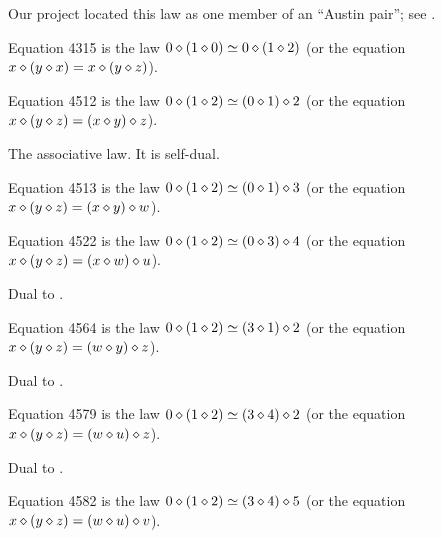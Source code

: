 Our project located this law as one member of an ``Austin pair''; see .

\begin{definition}[Equation 4315]\label{eq4315}\leanok{}  Equation 4315 is the law $0 \diamond (1 \diamond 0)  \simeq  0 \diamond (1 \diamond 2)$ (or the equation $x \diamond (y \diamond x) = x \diamond (y \diamond z)$).
\end{definition}

\begin{definition}[Equation 4512]\label{eq4512}\leanok{}  Equation 4512 is the law $0 \diamond (1 \diamond 2)  \simeq  (0 \diamond 1) \diamond 2$ (or the equation $x \diamond (y \diamond z) = (x \diamond y) \diamond z$).
\end{definition}

The associative law. It is self-dual.

\begin{definition}[Equation 4513]\label{eq4513}\leanok{}  Equation 4513 is the law $0 \diamond (1 \diamond 2)  \simeq  (0 \diamond 1) \diamond 3$ (or the equation $x \diamond (y \diamond z) = (x \diamond y) \diamond w$).
\end{definition}

\begin{definition}[Equation 4522]\label{eq4522}\leanok{}  Equation 4522 is the law $0 \diamond (1 \diamond 2)  \simeq  (0 \diamond 3) \diamond 4$ (or the equation $x \diamond (y \diamond z) = (x \diamond w) \diamond u$).
\end{definition}

Dual to .

\begin{definition}[Equation 4564]\label{eq4564}\leanok{}  Equation 4564 is the law $0 \diamond (1 \diamond 2)  \simeq  (3 \diamond 1) \diamond 2$ (or the equation $x \diamond (y \diamond z) = (w \diamond y) \diamond z$).
\end{definition}

Dual to .

\begin{definition}[Equation 4579]\label{eq4579}\leanok{}  Equation 4579 is the law $0 \diamond (1 \diamond 2)  \simeq  (3 \diamond 4) \diamond 2$ (or the equation $x \diamond (y \diamond z) = (w \diamond u) \diamond z$).
\end{definition}

Dual to .

\begin{definition}[Equation 4582]\label{eq4582}\leanok{}  Equation 4582 is the law $0 \diamond (1 \diamond 2)  \simeq  (3 \diamond 4) \diamond 5$ (or the equation $x \diamond (y \diamond z) = (w \diamond u) \diamond v$).
\end{definition}

